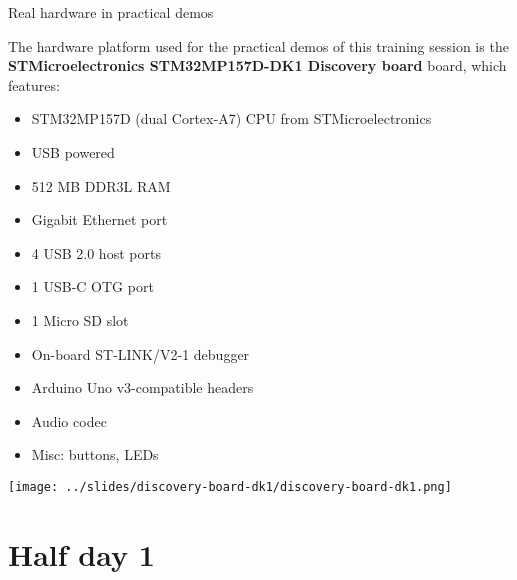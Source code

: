 \documentclass[a4paper,12pt,obeyspaces,spaces,hyphens]{article}
\begin{document}
\feshowtitle

\onlinepedagogics
{}
\certificate{}
\disabilities{}

\feagendatwocolumn
{Real hardware in practical demos}
{
  The hardware platform used for the practical demos of this training
  session is the {\bf STMicroelectronics STM32MP157D-DK1 Discovery
    board} board, which features:

  \begin{itemize}
  \item STM32MP157D (dual Cortex-A7) CPU from STMicroelectronics
  \item USB powered
  \item 512 MB DDR3L RAM
  \item Gigabit Ethernet port
  \item 4 USB 2.0 host ports
  \item 1 USB-C OTG port
  \item 1 Micro SD slot
  \item On-board ST-LINK/V2-1 debugger
  \item Arduino Uno v3-compatible headers
  \item Audio codec
  \item Misc: buttons, LEDs
  \end{itemize}
}
{}
{
  \begin{center}
  \texttt{[image: ../slides/discovery-board-dk1/discovery-board-dk1.png]}
  \end{center}
}

\section{Half day 1}
\end{document}
